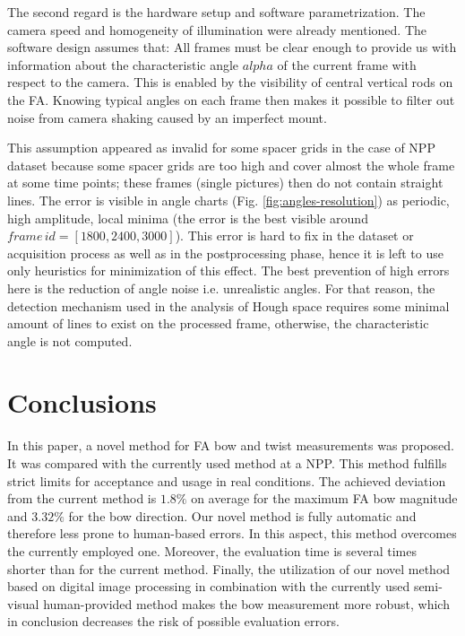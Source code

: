 \documentclass[preprint,12pt]{elsarticle}
\begin{document}
The second regard is the hardware setup and software parametrization. The camera speed and homogeneity of illumination were already mentioned. The software design assumes that: {\label{assumption:preprocessing_frames_normalization} All frames must be clear enough to provide us with information about the characteristic angle $alpha$ of the current frame with respect to the camera. This is enabled by the visibility of central vertical rods on the \ac{FA}. Knowing typical angles on each frame then makes it possible to filter out noise from camera shaking caused by an imperfect mount.}

This assumption appeared as invalid for some spacer grids in the case of \ac{NPP} dataset because some spacer grids are too high and cover almost the whole frame at some time points; these frames (single pictures) then do not contain straight lines. The error is visible in angle charts (Fig. \ref{fig:angles-resolution}) as periodic, high amplitude, local minima (the error is the best visible around $frame\,id = [1800, 2400, 3000]$). This error is hard to fix in the dataset or acquisition process as well as in the postprocessing phase, hence it is left to use only heuristics for minimization of this effect.
The best prevention of high errors here is the reduction of angle noise i.e. unrealistic angles. For that reason, the detection mechanism used in the analysis of Hough space requires some minimal amount of lines to exist on the processed frame, otherwise, the characteristic angle is not computed.

\section{Conclusions}

In this paper, a novel method for \ac{FA} bow and twist measurements was proposed. It was compared with the currently used method at a \ac{NPP}. This method fulfills strict limits for acceptance and usage in real conditions. The achieved deviation from the current method is $1.8\%$ on average for the maximum \ac{FA} bow magnitude and $3.32\%$ for the bow direction. Our novel method is fully automatic and therefore less prone to human-based errors. In this aspect, this method overcomes the currently employed one. Moreover, the evaluation time is several times shorter than for the current method. Finally, the utilization of our novel method based on digital image processing in combination with the currently used semi-visual human-provided method makes the bow measurement more robust, which in conclusion decreases the risk of possible evaluation errors.
\end{document}
